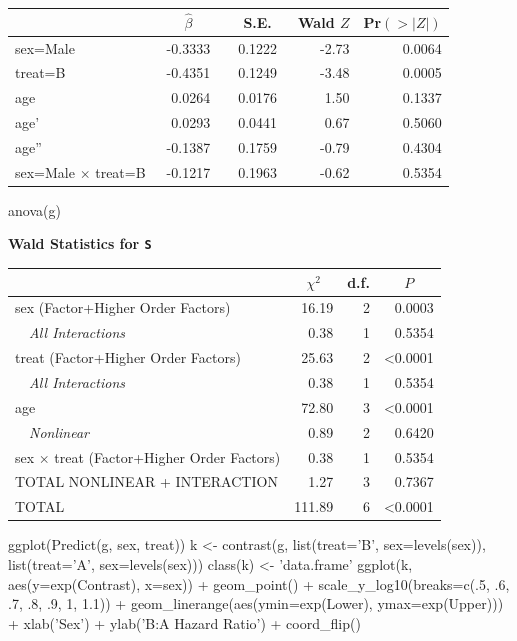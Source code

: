  \setlongtables\begin{longtable}{lrrrr}\hline
 \multicolumn{1}{l}{}&\multicolumn{1}{c}{$\hat{\beta}$}&\multicolumn{1}{c}{S.E.}&\multicolumn{1}{c}{Wald $Z$}&\multicolumn{1}{c}{Pr$(>|Z|)$}\tabularnewline
 \hline
 \endhead
 \hline
 \endfoot
 sex=Male&~-0.3333~&~0.1222~&-2.73&0.0064\tabularnewline
 treat=B&~-0.4351~&~0.1249~&-3.48&0.0005\tabularnewline
 age&~ 0.0264~&~0.0176~& 1.50&0.1337\tabularnewline
 age'&~ 0.0293~&~0.0441~& 0.67&0.5060\tabularnewline
 age''&~-0.1387~&~0.1759~&-0.79&0.4304\tabularnewline
 sex=Male $\times$ treat=B&~-0.1217~&~0.1963~&-0.62&0.5354\tabularnewline
 \hline
 \end{longtable}
 \addtocounter{table}{-1}
\begin{Sinput}
anova(g)
\end{Sinput}
\textbf{\Needspace{2in}
Wald Statistics for \texttt{\smaller S}}\begin{center}
\begin{tabular}{lrrr}
\hline\hline
\multicolumn{1}{l}{}&\multicolumn{1}{c}{$\chi^{2}$}&\multicolumn{1}{c}{d.f.}&\multicolumn{1}{c}{$P$}\tabularnewline
\hline
sex  (Factor+Higher Order Factors)& 16.19&2&0.0003\tabularnewline
~~\emph{All Interactions}&  0.38&1&0.5354\tabularnewline
treat  (Factor+Higher Order Factors)& 25.63&2&\textless 0.0001\tabularnewline
~~\emph{All Interactions}&  0.38&1&0.5354\tabularnewline
age& 72.80&3&\textless 0.0001\tabularnewline
~~\emph{Nonlinear}&  0.89&2&0.6420\tabularnewline
sex $\times$ treat  (Factor+Higher Order Factors)&  0.38&1&0.5354\tabularnewline
TOTAL NONLINEAR + INTERACTION&  1.27&3&0.7367\tabularnewline
TOTAL&111.89&6&\textless 0.0001\tabularnewline
\hline
\end{tabular}\end{center}
\begin{Sinput}
ggplot(Predict(g, sex, treat))
k <- contrast(g, list(treat='B', sex=levels(sex)), list(treat='A', sex=levels(sex)))
class(k) <- 'data.frame'
ggplot(k, aes(y=exp(Contrast), x=sex)) + geom_point() + scale_y_log10(breaks=c(.5, .6, .7, .8, .9, 1, 1.1)) +
  geom_linerange(aes(ymin=exp(Lower), ymax=exp(Upper))) + 
  xlab('Sex') + ylab('B:A Hazard Ratio') + coord_flip()
\end{Sinput}


